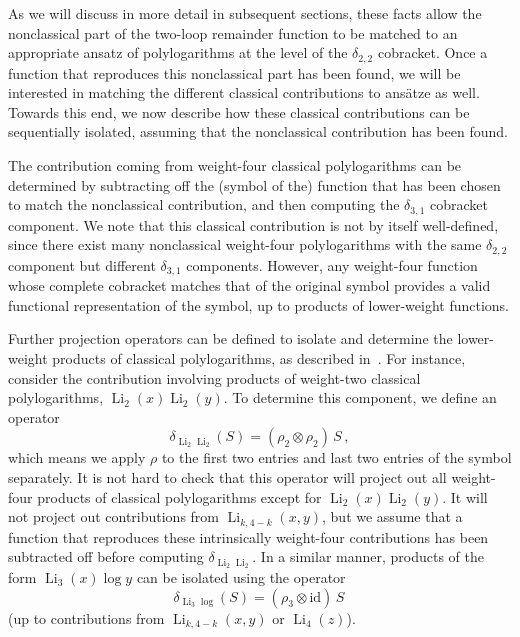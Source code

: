 \documentclass[11pt]{article}
\DeclareMathOperator{\Li}{Li}
\begin{document}
As we will discuss in more detail in subsequent sections, these facts allow the nonclassical part of the two-loop remainder function to be matched to an appropriate ansatz of polylogarithms at the level of the $\delta_{2,2}$ cobracket. Once a function that reproduces this nonclassical part has been found, we will be interested in matching the different classical contributions to ans\"atze as well. Towards this end, we now describe how these classical contributions can be sequentially isolated, assuming that the nonclassical contribution has been found.

The contribution coming from weight-four classical polylogarithms can be determined by subtracting off the (symbol of the) function that has been chosen to match the nonclassical contribution, and then computing the $\delta_{3,1}$ cobracket component. We note that this classical contribution is not by itself well-defined, since there exist many nonclassical weight-four polylogarithms with the same $\delta_{2,2}$ component but different $\delta_{3,1}$ components. However, any weight-four function whose complete cobracket matches that of the original symbol provides a valid functional representation of the symbol, up to products of lower-weight functions.  

Further projection operators can be defined to isolate and determine the lower-weight products of classical polylogarithms, as described in~\cite{Goncharov:2010jf}. For instance, consider the contribution involving products of weight-two classical polylogarithms, $\Li_2(x) \Li_2(y)$. To determine this component, we define an operator
\begin{equation}
\delta_{\Li_2 \Li_2} (S)= (\rho_2 \otimes \rho_2)\, S \, , \label{eq:proj_op_1}
\end{equation}
which means we apply $\rho$ to the first two entries and last two entries of the symbol separately. It is not hard to check that this operator will project out all weight-four products of classical polylogarithms except for $\Li_2(x) \Li_2(y)$. It will not project out contributions from $\Li_{k,4-k}(x,y)$, but we assume that a function that reproduces these intrinsically weight-four contributions has been subtracted off before computing $\delta_{\Li_2 \Li_2}$. In a similar manner, products of the form $\Li_3(x) \log y$ can be isolated using the operator
\begin{equation}
\delta_{\Li_3 \log} (S)= (\rho_3 \otimes \text{id})\, S \,  \label{eq:proj_op_2} 
\end{equation}
(up to contributions from $\Li_{k,4-k}(x,y)$ or $\Li_4(z)$). 
\end{document}
